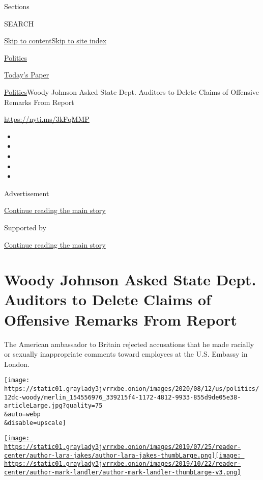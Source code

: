Sections

SEARCH

\protect\hyperlink{site-content}{Skip to
content}\protect\hyperlink{site-index}{Skip to site index}

\href{https://www.nytimes3xbfgragh.onion/section/politics}{Politics}

\href{https://myaccount.nytimes3xbfgragh.onion/auth/login?response_type=cookie\&client_id=vi}{}

\href{https://www.nytimes3xbfgragh.onion/section/todayspaper}{Today's
Paper}

\href{/section/politics}{Politics}\textbar{}Woody Johnson Asked State
Dept. Auditors to Delete Claims of Offensive Remarks From Report

\url{https://nyti.ms/3kFqMMP}

\begin{itemize}
\item
\item
\item
\item
\item
\end{itemize}

Advertisement

\protect\hyperlink{after-top}{Continue reading the main story}

Supported by

\protect\hyperlink{after-sponsor}{Continue reading the main story}

\hypertarget{woody-johnson-asked-state-dept-auditors-to-delete-claims-of-offensive-remarks-from-report}{%
\section{Woody Johnson Asked State Dept. Auditors to Delete Claims of
Offensive Remarks From
Report}\label{woody-johnson-asked-state-dept-auditors-to-delete-claims-of-offensive-remarks-from-report}}

The American ambassador to Britain rejected accusations that he made
racially or sexually inappropriate comments toward employees at the U.S.
Embassy in London.

\texttt{[image: https://static01.graylady3jvrrxbe.onion/images/2020/08/12/us/politics/12dc-woody/merlin\_154556976\_339215f4-1172-4812-9933-855d9de05e38-articleLarge.jpg?quality=75\\\&auto=webp\\\&disable=upscale]}

\href{https://www.nytimes3xbfgragh.onion/by/lara-jakes}{\texttt{[image: https://static01.graylady3jvrrxbe.onion/images/2019/07/25/reader-center/author-lara-jakes/author-lara-jakes-thumbLarge.png]}}\href{https://www.nytimes3xbfgragh.onion/by/mark-landler}{\texttt{[image: https://static01.graylady3jvrrxbe.onion/images/2019/10/22/reader-center/author-mark-landler/author-mark-landler-thumbLarge-v3.png]}}

